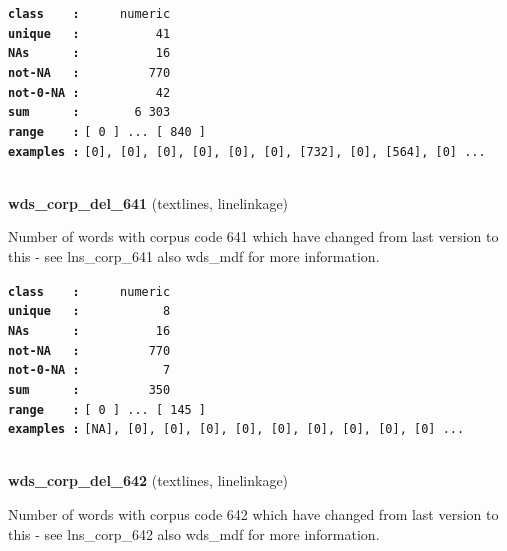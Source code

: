 \documentclass[]{article}
\begin{document}
\textbf{\texttt{class\ \ \ \ :}} \texttt{~~~~~numeric}\\
\textbf{\texttt{unique\ \ \ :}} \texttt{~~~~~~~~~~41}\\
\textbf{\texttt{NAs\ \ \ \ \ \ :}} \texttt{~~~~~~~~~~16}\\
\textbf{\texttt{not-NA\ \ \ :}} \texttt{~~~~~~~~~770}\\
\textbf{\texttt{not-0-NA\ :}} \texttt{~~~~~~~~~~42}\\
\textbf{\texttt{sum\ \ \ \ \ \ :}} \texttt{~~~~~~~6~303}\\
\textbf{\texttt{range\ \ \ \ :}}
\texttt{{[}\ 0\ {]}\ ...\ {[}\ 840\ {]}}\\
\textbf{\texttt{examples\ :}}
\texttt{{[}0{]},\ {[}0{]},\ {[}0{]},\ {[}0{]},\ {[}0{]},\ {[}0{]},\ {[}732{]},\ {[}0{]},\ {[}564{]},\ {[}0{]}\ ...}\\

~

\textbf{wds\_corp\_del\_641} (textlines, linelinkage)

Number of words with corpus code 641 which have changed from last
version to this - see lns\_corp\_641 also wds\_mdf for more information.

\textbf{\texttt{class\ \ \ \ :}} \texttt{~~~~~numeric}\\
\textbf{\texttt{unique\ \ \ :}} \texttt{~~~~~~~~~~~8}\\
\textbf{\texttt{NAs\ \ \ \ \ \ :}} \texttt{~~~~~~~~~~16}\\
\textbf{\texttt{not-NA\ \ \ :}} \texttt{~~~~~~~~~770}\\
\textbf{\texttt{not-0-NA\ :}} \texttt{~~~~~~~~~~~7}\\
\textbf{\texttt{sum\ \ \ \ \ \ :}} \texttt{~~~~~~~~~350}\\
\textbf{\texttt{range\ \ \ \ :}}
\texttt{{[}\ 0\ {]}\ ...\ {[}\ 145\ {]}}\\
\textbf{\texttt{examples\ :}}
\texttt{{[}NA{]},\ {[}0{]},\ {[}0{]},\ {[}0{]},\ {[}0{]},\ {[}0{]},\ {[}0{]},\ {[}0{]},\ {[}0{]},\ {[}0{]}\ ...}\\

~

\textbf{wds\_corp\_del\_642} (textlines, linelinkage)

Number of words with corpus code 642 which have changed from last
version to this - see lns\_corp\_642 also wds\_mdf for more information.
\end{document}
